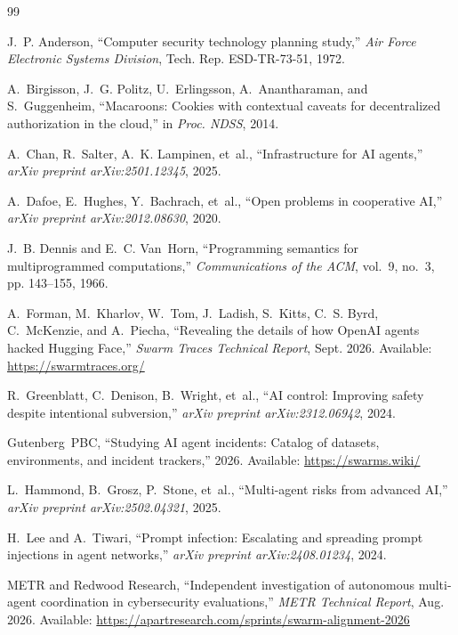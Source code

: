 \documentclass[10pt,twocolumn,a4paper]{article}
\begin{document}
\begin{thebibliography}{99}

J.~P. Anderson, ``Computer security technology planning study,'' \emph{Air Force Electronic Systems Division}, Tech. Rep. ESD-TR-73-51, 1972.

A.~Birgisson, J.~G. Politz, U.~Erlingsson, A.~Anantharaman, and S.~Guggenheim, ``Macaroons: Cookies with contextual caveats for decentralized authorization in the cloud,'' in \emph{Proc. NDSS}, 2014.

A.~Chan, R.~Salter, A.~K. Lampinen, et~al., ``Infrastructure for AI agents,'' \emph{arXiv preprint arXiv:2501.12345}, 2025.

A.~Dafoe, E.~Hughes, Y.~Bachrach, et~al., ``Open problems in cooperative AI,'' \emph{arXiv preprint arXiv:2012.08630}, 2020.

J.~B. Dennis and E.~C. Van~Horn, ``Programming semantics for multiprogrammed computations,'' \emph{Communications of the ACM}, vol.~9, no.~3, pp. 143--155, 1966.

A.~Forman, M.~Kharlov, W.~Tom, J.~Ladish, S.~Kitts, C.~S. Byrd, C.~McKenzie, and A.~Piecha, ``Revealing the details of how OpenAI agents hacked Hugging Face,'' \emph{Swarm Traces Technical Report}, Sept. 2026. Available: \url{https://swarmtraces.org/}

R.~Greenblatt, C.~Denison, B.~Wright, et~al., ``AI control: Improving safety despite intentional subversion,'' \emph{arXiv preprint arXiv:2312.06942}, 2024.

Gutenberg~PBC, ``Studying AI agent incidents: Catalog of datasets, environments, and incident trackers,'' 2026. Available: \url{https://swarms.wiki/}

L.~Hammond, B.~Grosz, P.~Stone, et~al., ``Multi-agent risks from advanced AI,'' \emph{arXiv preprint arXiv:2502.04321}, 2025.

H.~Lee and A.~Tiwari, ``Prompt infection: Escalating and spreading prompt injections in agent networks,'' \emph{arXiv preprint arXiv:2408.01234}, 2024.

METR and Redwood Research, ``Independent investigation of autonomous multi-agent coordination in cybersecurity evaluations,'' \emph{METR Technical Report}, Aug. 2026. Available: \url{https://apartresearch.com/sprints/swarm-alignment-2026}


\end{thebibliography}
\end{document}
